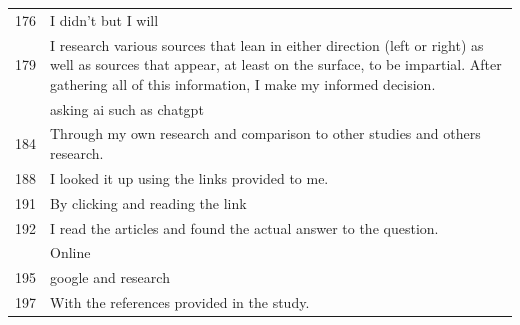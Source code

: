 \documentclass[
  doc,floatsintext]{apa6}
\begin{document}
\begin{longtable}[t]{>{}r>{\raggedright\arraybackslash}p{30em}}
176 & I didn’t but I will\\
179 & I research various sources that lean in either direction (left or right) as well as sources that appear, at least on the surface, to be impartial. After gathering all of this information, I make my informed decision.\\
\addlinespace
183 & asking ai such as chatgpt\\
184 & Through my own research and comparison to other studies and others research.\\
188 & I looked it up using the links provided to me.\\
191 & By clicking and reading the link\\
192 & I read the articles and found the actual answer to the question.\\
\addlinespace
194 & Online\\
195 & google and research\\
197 & With the references provided in the study.\\
\bottomrule
\end{longtable}
\end{document}
